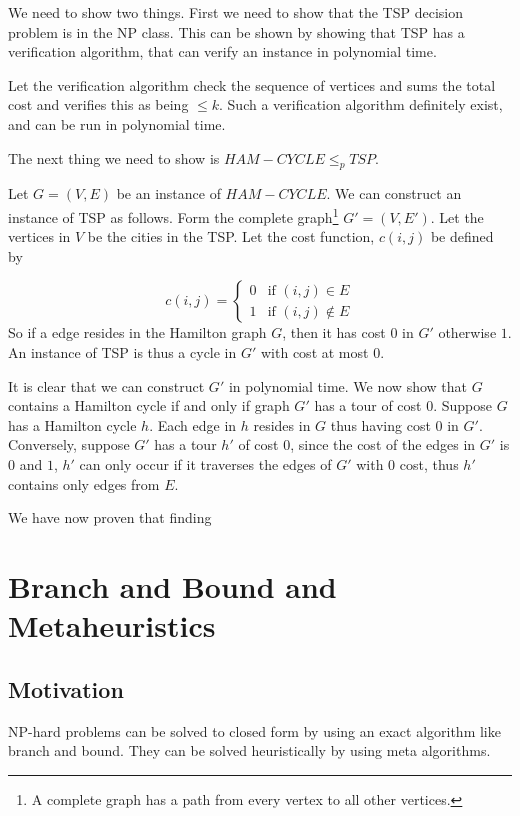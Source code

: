 \documentclass[10pt]{article}
\begin{document}
We need to show two things. First we need to show that the TSP decision problem is in the NP class. This can be shown by showing that TSP has a verification algorithm, that can verify an instance in polynomial time. 

Let the verification algorithm check the sequence of vertices and sums the total cost and verifies this as being $\leq k$. Such a verification algorithm definitely exist, and can be run in polynomial time.

The next thing we need to show is $HAM-CYCLE \leq_p TSP$. 

Let $G=(V,E)$ be an instance of $HAM-CYCLE$. We can construct an instance of TSP as follows. Form the complete graph\footnote{A complete graph has a path from every vertex to all other vertices.} $G' = (V,E')$. Let the vertices in $V$ be the cities in the TSP. Let the cost function, $c(i,j)$ be defined by

\begin{equation} 
c(i,j) = 
\left\{
\begin{array}{rl} 
  0 & \text{if } (i,j) \in E \\
  1 & \text{if } (i,j) \notin E 
\end{array} 
\right. 
\end{equation} 
So if a edge resides in the Hamilton graph $G$, then it has cost $0$ in $G'$ otherwise $1$. An instance of TSP is thus a cycle in $G'$ with cost at most $0$.

It is clear that we can construct $G'$ in polynomial time. We now show that $G$ contains a Hamilton cycle if and only if graph $G'$ has a tour of cost $0$. Suppose $G$ has a Hamilton cycle $h$. Each edge in $h$ resides in $G$ thus having cost $0$ in $G'$. Conversely, suppose $G'$ has a tour $h'$ of cost $0$, since the cost of the edges in $G'$ is $0$ and $1$, $h'$ can only occur if it traverses the edges of $G'$ with $0$ cost, thus $h'$ contains only edges from $E$.  


We have now proven that finding 

\clearpage \newpage
\section{Branch and Bound and Metaheuristics} %
\label{sec:branch_and_bound_and_metaheuristics}


\subsection{Motivation} %
\label{sub:motivation}
NP-hard problems can be solved to closed form by using an exact algorithm like branch and bound. They can be solved heuristically by using meta algorithms.
\end{document}
